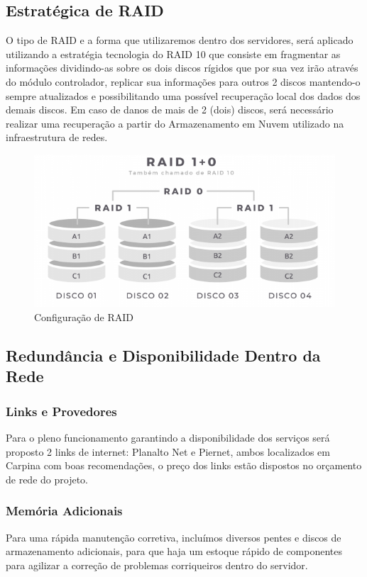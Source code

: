 \documentclass[12pt]{article}
\begin{document}
\subsection{Estratégica de RAID}
O tipo de RAID e a forma que utilizaremos dentro dos servidores, será aplicado utilizando a estratégia tecnologia do RAID 10 que consiste em fragmentar as informações dividindo-as sobre os dois discos rígidos que por sua vez irão através do módulo controlador, replicar sua informações para outros 2 discos mantendo-o sempre atualizados e possibilitando uma possível recuperação local dos dados dos demais discos. Em caso de danos de mais de 2 (dois) discos, será necessário realizar uma recuperação a partir do Armazenamento em Nuvem utilizado na infraestrutura de redes.
\begin{figure}[ht]
\centering
\includegraphics[height=0.5\textwidth]{RAID10.png}
\caption{Configuração de RAID}
\label{fig:adds-pastas}
\end{figure}
\subsection{Redundância e Disponibilidade Dentro da Rede}
\subsubsection{Links e Provedores}
Para o pleno funcionamento garantindo a disponibilidade dos serviços será proposto 2 links de internet: Planalto Net e Piernet, ambos localizados em Carpina com boas recomendações, o preço dos links estão dispostos no orçamento de rede do projeto.
\subsubsection{Memória Adicionais}
Para uma rápida manutenção corretiva, incluímos diversos pentes e discos de armazenamento adicionais, para que haja um estoque rápido de componentes para agilizar a correção de problemas corriqueiros dentro do servidor.
\end{document}
